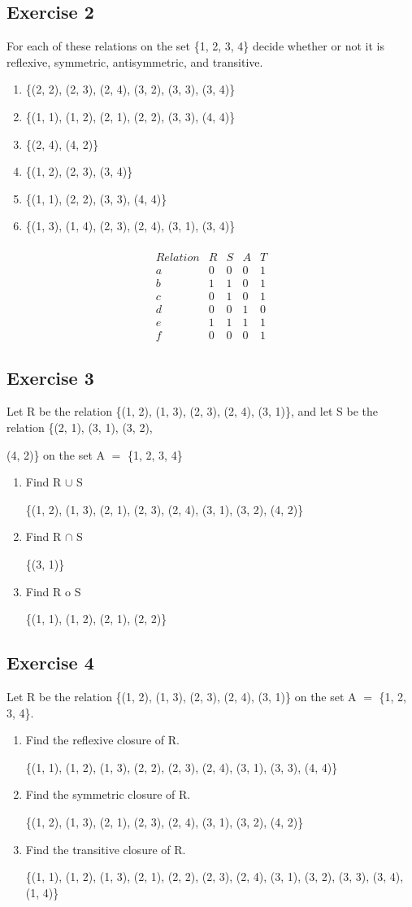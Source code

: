 \documentclass{article}
\newcommand{\mt}[1]{\ensuremath{#1}}
\newcommand\ssc[2][\DefaultOpt]{%
  \def\DefaultOpt{#2}%
  \subsection[#1]{#2}%
}
\newcommand{\balist}{\begin{enumerate}[label=\alph*.]}
\newcommand{\elist}{\end{enumerate}}
\newcommand{\bk}[1]{\{#1\}}
\newcommand{\eql}{\mt{=} }
\newcommand{\eqn}[1]{\[#1\]}
\newcommand{\unn}{\mt{\cup} }
\newcommand{\inn}{\mt{\cap} }
\begin{document}
\ssc{Exercise 2}{

For each of these relations on the set \bk{1, 2, 3, 4} decide whether or not it is reflexive, symmetric, antisymmetric, and transitive.
\balist
\item \bk{(2, 2), (2, 3), (2, 4), (3, 2), (3, 3), (3, 4)}
\item \bk{(1, 1), (1, 2), (2, 1), (2, 2), (3, 3), (4, 4)}
\item \bk{(2, 4), (4, 2)}
\item \bk{(1, 2), (2, 3), (3, 4)}
\item \bk{(1, 1), (2, 2), (3, 3), (4, 4)}
\item \bk{(1, 3), (1, 4), (2, 3), (2, 4), (3, 1), (3, 4)}
\elist

\eqn{
\begin{matrix}{} \\
 Relation & R & S & A & T \\
 a & 0 & 0 & 0 & 1 \\
 b & 1 & 1 & 0 & 1 \\
 c & 0 & 1 & 0 & 1 \\
 d & 0 & 0 & 1 & 0 \\
 e & 1 & 1 & 1 & 1 \\
 f & 0 & 0 & 0 & 1
\end{matrix}}

}

\ssc{Exercise 3}{

Let R be the relation \bk{(1, 2), (1, 3), (2, 3), (2, 4), (3, 1)}, and let S be the relation \bk{(2, 1), (3, 1), (3, 2),

(4, 2)} on the set A \eql \bk{1, 2, 3, 4}

\balist
\item Find R \unn S

\bk{(1, 2), (1, 3), (2, 1), (2, 3), (2, 4), (3, 1), (3, 2), (4, 2)}

\item Find R \inn S

\bk{(3, 1)}

\item Find R o S

\bk{(1, 1), (1, 2), (2, 1), (2, 2)}

\elist

}

\ssc{Exercise 4}{

Let R be the relation \bk{(1, 2), (1, 3), (2, 3), (2, 4), (3, 1)} on the set A \eql \bk{1, 2, 3, 4}.

\balist
\item Find the reflexive closure of R.

\bk{(1, 1), (1, 2), (1, 3), (2, 2), (2, 3), (2, 4), (3, 1), (3, 3), (4, 4)}

\item Find the symmetric closure of R.

\bk{(1, 2), (1, 3), (2, 1), (2, 3), (2, 4), (3, 1), (3, 2), (4, 2)}

\item Find the transitive closure of R.

\bk{(1, 1), (1, 2), (1, 3), (2, 1), (2, 2), (2, 3), (2, 4), (3, 1), (3, 2), (3, 3), (3, 4), (1, 4)}

\elist

}
\end{document}
